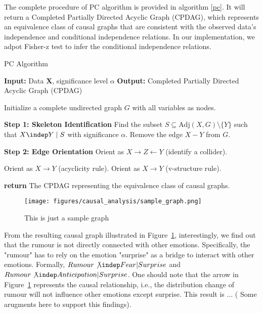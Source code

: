 The complete procedure of PC algorithm is provided in algorithm \ref{pc}. It will return a  Completed Partially Directed Acyclic Graph (CPDAG), which represents an equivalence class of causal graphs that are consistent with the observed data’s independence and conditional independence relations. In our implementation, we adpot  Fisher-z test \cite{fisher_probable_1921} to infer the conditional independence relations. 


\begin{algorithm}[ht!] 
\caption{PC Algorithm}
\label{pc}
\begin{algorithmic}[1] 
\State \textbf{Input:} Data $\mathbf{X}$, significance level $\alpha$
\State \textbf{Output:} Completed Partially Directed Acyclic Graph (CPDAG)

\State Initialize a complete undirected graph $G$ with all variables as nodes.

\State \textbf{Step 1: Skeleton Identification}
    \State Find the subset $S \subseteq \text{Adj}(X, G) \setminus \{Y\}$ such that 
    $X \indep Y \mid S$ with significance $\alpha$.
        \State Remove the edge $X - Y$ from $G$.
    \EndIf
\EndFor

\State \textbf{Step 2: Edge Orientation}
        \State Orient as $X \to Z \leftarrow Y$ (identify a collider).
    \EndIf
\EndFor

            \State Orient as $X \to Y$ (acyclicity rule).
            \State Orient as $X \to Y$ (v-structure rule).
        \EndIf
    \EndFor
\EndWhile

\State \textbf{return} The CPDAG representing the equivalence class of causal graphs.

\end{algorithmic}
\end{algorithm}


\begin{figure}[t!]
    \centering
    \texttt{[image: figures/causal\_analysis/sample\_graph.png]}
    \caption{This is just a sample graph}
\label{fig:causal graph}
\end{figure}

From the resulting causal graph illustrated in Figure~\ref{fig:causal graph}, interestingly, we find out that the rumour is not directly connected with other emotions. Specifically, the "rumour" has to rely on the emotion "surprise" as a bridge to interact with other emotions. Formally, $Rumour \not \indep Fear | Surprise$ and $Rumour \not \indep Anticipation | Surprise$. 
One should note that the arrow in Figure~\ref{fig:causal graph} represents the causal relationship, i.e., the distribution change of rumour will not influence other emotions except surprise. 
This result is ... ( Some arugments here to support this findings). 
